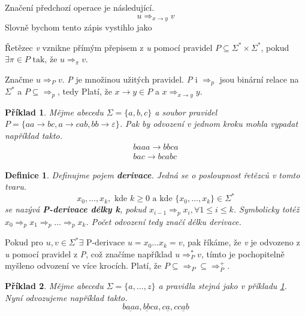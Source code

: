\documentclass[10pt, a4paper, titlepage]{article}
\theoremstyle{note}
\newtheorem{definice}{\textbf{Definice}}
\newtheorem{priklad}{\textbf{Příklad}}
\begin{document}
Značení předchozí operace je následující.
$$
u \Rightarrow_{x \rightarrow y} v
$$
Slovně bychom tento zápis vystihlo jako 

Řetězec \emph{v} vznikne přímým přepisem z \emph{u} pomocí pravidel $P \subseteq  \Sigma^{*} \times \Sigma^{*}$, pokud
$\exists \pi \in P \text{ tak, že } u \Rightarrow_{\pi} v$.

Značme $u \Rightarrow_{P} v$. \emph{P} je množinou užitých pravidel. \emph{P} i $\Rightarrow_{p}$ jsou binární relace na $\Sigma^{*}$ a
$P \subseteq  \Rightarrow_{p}$, tedy  Platí, že $x \rightarrow y \in P$ a $x \Rightarrow_{x \rightarrow y} y$.

\begin{priklad}
Mějme abecedu $\Sigma = \lbrace a, b, c \rbrace$ a soubor pravidel $P = \lbrace aa \rightarrow bc, a \rightarrow cab, bb \rightarrow \varepsilon \rbrace$\label{priklad-1}.
Pak by odvození v jednom kroku mohla vypadat například takto.
\begin{gather*}
baaa \rightarrow bbca \\
bac \rightarrow bcabc
\end{gather*}
\end{priklad}

\begin{definice}
Definujme pojem \textbf{derivace}. Jedná se o posloupnost řetězců v tomto tvaru.
$$
x_{0}, \ldots, x_{k},\text{ kde } k \geq 0\text{ a kde } \lbrace x_{0}, \ldots, x_{k} \rbrace \in \Sigma^{*}
$$ se nazývá \textbf{P-derivace délky k}, pokud $x_{i-1} \Rightarrow_{p} x_{i},
\forall 1 \leq i \leq k $.
Symbolicky totéž $x_{0} \Rightarrow_{p} x_{1} \Rightarrow_{p} \ldots \Rightarrow_{p} x_{k}$. Počet odvození tedy značí \emph{délku} derivace.
\end{definice}

Pokud pro $u, v \in \Sigma^{*} \exists \text{ P-derivace } u = x_{0} \ldots x_{k} = v$, pak říkáme, že \emph{v} je odvozeno z \emph{u} pomocí pravidel z \emph{P}, což značíme
například $u \Rightarrow_{P}^{*} v$, tímto je pochopitelně myšleno odvození ve více krocích. Platí, že $P \subseteq \Rightarrow_{P} \subseteq \Rightarrow_{P}^{+}$.

\begin{priklad}
Mějme abecedu $\Sigma = \lbrace a, \ldots, z \rbrace$ a pravidla stejná jako v příkladu \ref{priklad-1}.
Nyní odvozujeme například takto.
$$
b\underline{aa}a, \underline{bb}ca, c\underline{a}, c\underline{cab}
$$
\end{priklad}
\end{document}
